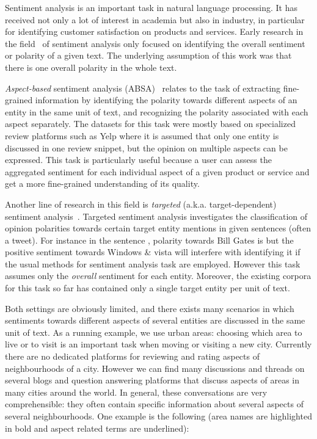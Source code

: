 \documentclass[11pt]{article}
\begin{document}
    Sentiment analysis is an important task in natural language processing. It has received not only a lot of interest in academia but also in industry, in particular for identifying customer satisfaction on products and services. Early research in the field~\cite{das2001yahoo,morinaga2002mining} of sentiment analysis only focused on identifying the overall sentiment or polarity of a given text. The underlying assumption of this work was that there is one overall polarity in the whole text.
    
    \emph{Aspect-based} sentiment analysis (ABSA)~\cite{jo2011aspect,pontiki2015semeval,SemEval_2016_task5} relates to the task of extracting fine-grained information by identifying the polarity towards different aspects of an entity in the same unit of text, and recognizing the polarity associated with each aspect separately. The datasets for this task were mostly based on specialized review platforms such as Yelp where it is assumed that only one entity is discussed in one review snippet, but the opinion on multiple aspects can be expressed. This task is particularly useful because a user can assess the aggregated sentiment for each individual aspect of a given product or service and get a more fine-grained understanding of its quality.
    
    Another line of research in this field is \emph{targeted} (a.k.a. target-dependent) sentiment analysis~\cite{jiang2011target,vo2015target}. Targeted sentiment analysis investigates the classification of opinion polarities towards certain target entity mentions in given sentences (often a tweet). For instance in the sentence , polarity towards Bill Gates is  but the positive sentiment towards Windows \& vista will interfere with identifying it if the usual methods for sentiment analysis task are employed. However this task assumes only the \emph{overall} sentiment for each entity. Moreover, the existing corpora for this task so far has contained only a single target entity per unit of text.
    
    Both settings are obviously limited, and there exists many scenarios in which sentiments towards different aspects of several entities are discussed in the same unit of text. As a running example, we use urban areas: choosing which area to live or to visit is an important task when moving or visiting a new city. Currently there are no dedicated platforms for reviewing and rating aspects of neighbourhoods of a city. However we can find many discussions and threads on several blogs and question answering platforms that discuss aspects of areas in many cities around the world. In general, these conversations are very comprehensible: they often contain specific information about several aspects of several neighbourhoods. One example is the following (area names are highlighted in bold and aspect related terms are underlined): \\
    
\end{document}
